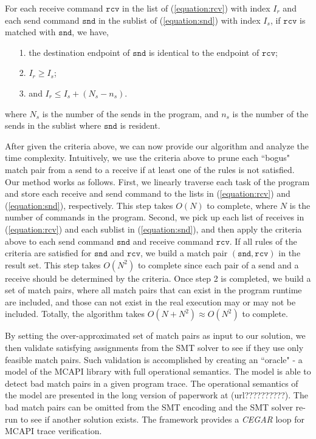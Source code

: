 For each receive command $\mathtt{rcv}$ in the list of (\ref{equation:rcv}) with index $I_r$ and each send command $\mathtt{snd}$ in the sublist of (\ref{equation:snd}) with index $I_s$, if $\mathtt{rcv}$ is matched with $\mathtt{snd}$, we have,
\begin{itemize}
\item[1.] the destination endpoint of $\mathtt{snd}$ is identical to the endpoint of $\mathtt{rcv}$;
\item[2.] $I_r \geq I_s$;
\item[3.] and $I_r \leq I_s + (N_s - n_s)$.
\end{itemize} 
where $N_s$ is the number of the sends in the program, and $n_s$ is the number of the sends in the sublist where $\mathtt{snd}$ is resident. 

After given the criteria above, we can now provide our algorithm and analyze the time complexity. Intuitively, we use the criteria above to prune each ``bogus" match pair from a send to a receive if at least one of the rules is not satisfied. Our method works as follows. First, we linearly traverse each task of the program and store each receive and send command to the lists in (\ref{equation:rcv}) and (\ref{equation:snd}), respectively. This step takes $O(N)$ to complete, where $N$ is the number of commands in the program. Second, we pick up each list of receives in (\ref{equation:rcv}) and each sublist in (\ref{equation:snd}), and then apply the criteria above to each send command $\mathtt{snd}$ and receive command $\mathtt{rcv}$. If all rules of the criteria are satisfied for $\mathtt{snd}$ and $\mathtt{rcv}$, we build a match pair $(\mathtt{snd},\mathtt{rcv})$ in the result set. This step takes $O(N^2)$ to complete since each pair of a send and a receive should be determined by the criteria. Once step 2 is completed, we build a set of match pairs, where all match pairs that can exist in the program runtime are included, and those can not exist in the real execution may or may not be included. Totally, the algorithm takes $O(N + N^2) \approx O(N^2)$ to complete.


By setting the over-approximated set of match pairs as input to our solution, we then validate satisfying assignments from the SMT solver to see if they use only feasible match pairs. Such validation is accomplished by creating an ``oracle" - a model of the MCAPI library with full operational semantics. The model is able to detect bad match pairs in a given program trace. The operational semantics of the model are presented in the long version of paperwork at (url??????????). The bad match pairs can be omitted from the SMT encoding and the SMT solver re-run to see if another solution exists. The framework provides a \textit{CEGAR} loop for MCAPI trace verification.
